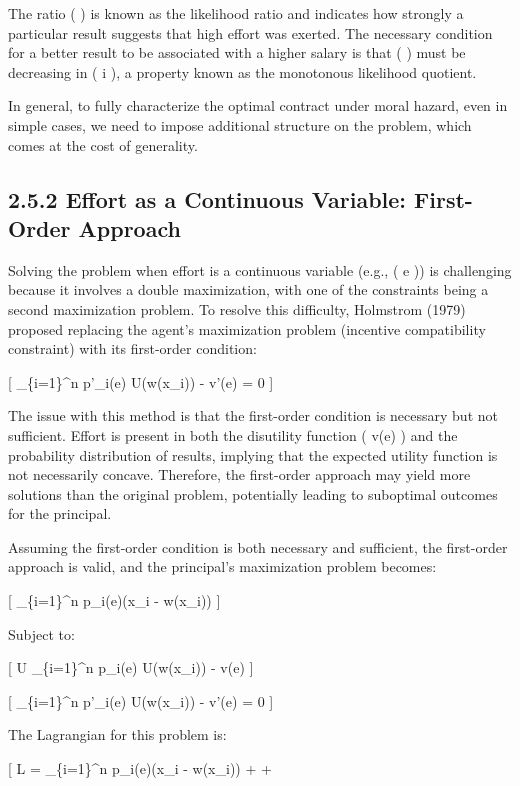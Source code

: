 \documentclass[
  letterpaper,
  DIV=11,
  numbers=noendperiod]{scrartcl}
\begin{document}
The ratio (  ) is known as the likelihood ratio and
indicates how strongly a particular result suggests that high effort was
exerted. The necessary condition for a better result to be associated
with a higher salary is that (  ) must be decreasing
in ( i ), a property known as the monotonous likelihood quotient.

In general, to fully characterize the optimal contract under moral
hazard, even in simple cases, we need to impose additional structure on
the problem, which comes at the cost of generality.

\subsection{2.5.2 Effort as a Continuous Variable: First-Order
Approach}\label{effort-as-a-continuous-variable-first-order-approach}

Solving the problem when effort is a continuous variable (e.g., ( e
\in [0, 1] )) is challenging because it involves a double maximization,
with one of the constraints being a second maximization problem. To
resolve this difficulty, Holmstrom (1979) proposed replacing the agent's
maximization problem (incentive compatibility constraint) with its
first-order condition:

{[} \sum\_\{i=1\}\^{}n p'\_i(e) U(w(x\_i)) - v'(e) = 0 {]}

The issue with this method is that the first-order condition is
necessary but not sufficient. Effort is present in both the disutility
function ( v(e) ) and the probability distribution of results, implying
that the expected utility function is not necessarily concave.
Therefore, the first-order approach may yield more solutions than the
original problem, potentially leading to suboptimal outcomes for the
principal.

Assuming the first-order condition is both necessary and sufficient, the
first-order approach is valid, and the principal's maximization problem
becomes:

{[} \max \sum\_\{i=1\}\^{}n p\_i(e)(x\_i - w(x\_i)) {]}

Subject to:

{[} U \leq \sum\_\{i=1\}\^{}n p\_i(e) U(w(x\_i)) - v(e) {]}

{[} \sum\_\{i=1\}\^{}n p'\_i(e) U(w(x\_i)) - v'(e) = 0 {]}

The Lagrangian for this problem is:

{[} L = \sum\_\{i=1\}\^{}n p\_i(e)(x\_i - w(x\_i)) +
\lambda \left[\sum_{i=1}^n p_H^i U(w(x_i)) - v(e_H) - U \right] +
\mu \left[ \sum_{i=1}^n p'_i(e) U(w(x_i)) - v'(e) \right]{]}
\end{document}

